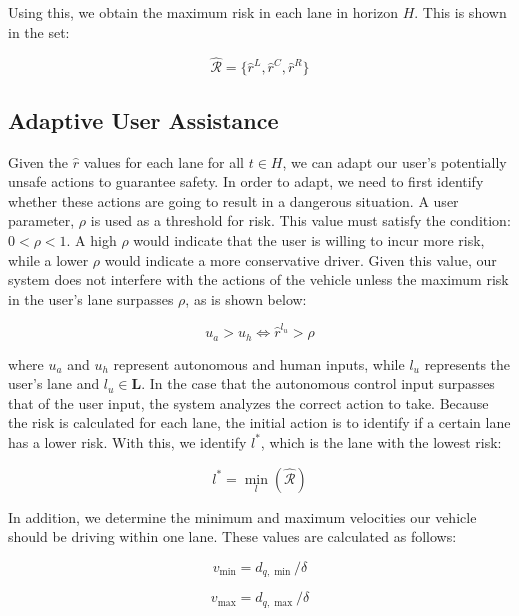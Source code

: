 \documentclass[letterpaper, 10 pt, conference]{ieeeconf}  %
\begin{document}
Using this, we obtain the maximum risk in each lane in horizon $H$. This is shown in the set:

\begin{equation}
    \hat{\mathcal{R}} = \{\hat{r}^{L},\hat{r}^{C},\hat{r}^{R}\}
\end{equation}

\subsection{Adaptive User Assistance}

Given the $\hat{r}$ values for each lane for all $t\in H$, we can adapt our user's potentially unsafe actions to guarantee safety. In order to adapt, we need to first identify whether these actions are going to result in a dangerous situation. A user parameter, $\rho$ is used as a threshold for risk. This value must satisfy the condition: $0<\rho<1$. A high $\rho$ would indicate that the user is willing to incur more risk, while a lower $\rho$ would indicate a more conservative driver. Given this value, our system does not interfere with the actions of the vehicle unless the maximum risk in the user's lane surpasses $\rho$, as is shown below:

\begin{equation}
    u_a > u_h \iff \hat r^{l_u} > \rho
\end{equation}

where $u_a$ and $u_h$ represent autonomous and human inputs, while $l_u$ represents the user's lane and $l_u \in \mathbf{L}$. In the case that the autonomous control input surpasses that of the user input, the system analyzes the correct action to take. Because the risk is calculated for each lane, the initial action is to identify if a certain lane has a lower risk. With this, we identify $l^*$, which is the lane with the lowest risk:

\begin{equation}
    l^* = \min_l(\mathcal{\hat{R}})
\end{equation}

In addition, we determine the minimum and maximum velocities our vehicle should be driving within one lane. These values are calculated as follows:

\begin{equation}
    v_{\min} = d_{q,\min}/\delta
\end{equation}

\begin{equation}
    v_{\max} = d_{q,\max}/\delta
\end{equation}
\end{document}
